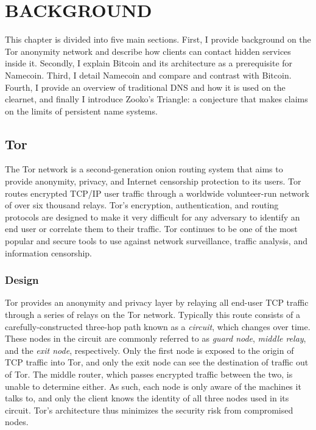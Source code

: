 \chapter{\uppercase{BACKGROUND}}

This chapter is divided into five main sections. First, I provide background on the Tor anonymity network and describe how clients can contact hidden services inside it. Secondly, I explain Bitcoin and its architecture as a prerequisite for Namecoin. Third, I detail Namecoin and compare and contrast with Bitcoin. Fourth, I provide an overview of traditional DNS and how it is used on the clearnet, and finally I introduce Zooko's Triangle: a conjecture that makes claims on the limits of persistent name systems.



\section{Tor}

The Tor network is a second-generation onion routing system that aims to provide anonymity, privacy, and Internet censorship protection to its users. Tor routes encrypted TCP/IP user traffic through a worldwide volunteer-run network of over six thousand relays. Tor's encryption, authentication, and routing protocols are designed to make it very difficult for any adversary to identify an end user or correlate them to their traffic. Tor continues to be one of the most popular and secure tools to use against network surveillance, traffic analysis, and information censorship.

\subsection{Design}

Tor provides an anonymity and privacy layer by relaying all end-user TCP traffic through a series of relays on the Tor network. Typically this route consists of a carefully-constructed three-hop path known as a \textit{circuit}, which changes over time. These nodes in the circuit are commonly referred to as \textit{guard node}, \textit{middle relay}, and the \textit{exit node}, respectively. Only the first node is exposed to the origin of TCP traffic into Tor, and only the exit node can see the destination of traffic out of Tor. The middle router, which passes encrypted traffic between the two, is unable to determine either. As such, each node is only aware of the machines it talks to, and only the client knows the identity of all three nodes used in its circuit. Tor's architecture thus minimizes the security risk from compromised nodes.\cite{McCoy2008}

